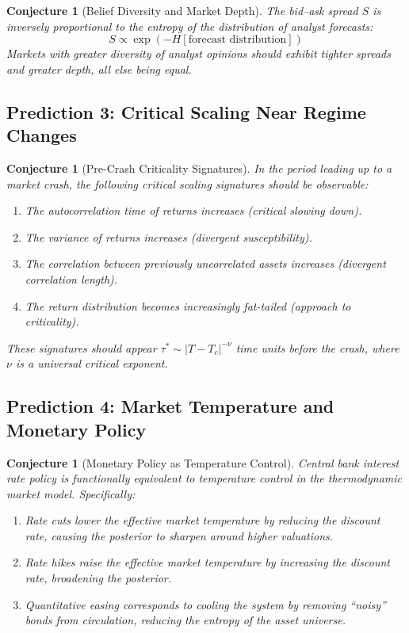 \documentclass[12pt,a4paper]{article}
\newtheorem{conjecture}[theorem]{Conjecture}
\theoremstyle{definition}
\begin{document}
\begin{conjecture}[Belief Diversity and Market Depth]\label{conj:entropy_liq}
The bid--ask spread $S$ is inversely proportional to the entropy of the distribution of analyst forecasts:
\begin{equation}
    S \propto \exp\left(-H[\text{forecast distribution}]\right)
\end{equation}
Markets with greater diversity of analyst opinions should exhibit tighter spreads and greater depth, all else being equal.
\end{conjecture}

\subsection{Prediction 3: Critical Scaling Near Regime Changes}

\begin{conjecture}[Pre-Crash Criticality Signatures]\label{conj:precritical}
In the period leading up to a market crash, the following critical scaling signatures should be observable:
\begin{enumerate}[label=(\roman*)]
    \item The autocorrelation time of returns increases (critical slowing down).
    \item The variance of returns increases (divergent susceptibility).
    \item The correlation between previously uncorrelated assets increases (divergent correlation length).
    \item The return distribution becomes increasingly fat-tailed (approach to criticality).
\end{enumerate}
These signatures should appear $\tau^* \sim |T - T_c|^{-\nu}$ time units before the crash, where $\nu$ is a universal critical exponent.
\end{conjecture}

\subsection{Prediction 4: Market Temperature and Monetary Policy}

\begin{conjecture}[Monetary Policy as Temperature Control]\label{conj:monetary}
Central bank interest rate policy is functionally equivalent to temperature control in the thermodynamic market model. Specifically:
\begin{enumerate}[label=(\roman*)]
    \item Rate cuts lower the effective market temperature by reducing the discount rate, causing the posterior to sharpen around higher valuations.
    \item Rate hikes raise the effective market temperature by increasing the discount rate, broadening the posterior.
    \item Quantitative easing corresponds to cooling the system by removing ``noisy'' bonds from circulation, reducing the entropy of the asset universe.
\end{enumerate}
\end{conjecture}
\end{document}
